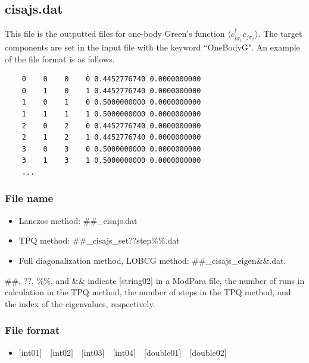 \newpage
\subsection{cisajs.dat}
\label{Subsec:cgcisajs}
This file is the outputted files for one-body Green's function $\langle c_{i\sigma_1}^{\dagger}c_{j\sigma_2}\rangle$. 
The target components are set in the input file with the keyword ``OneBodyG".
An example of the file format is as follows.

\begin{minipage}{12.5cm}
\begin{screen}
\begin{verbatim}
    0    0    0    0 0.4452776740 0.0000000000
    0    1    0    1 0.4452776740 0.0000000000
    1    0    1    0 0.5000000000 0.0000000000
    1    1    1    1 0.5000000000 0.0000000000
    2    0    2    0 0.4452776740 0.0000000000
    2    1    2    1 0.4452776740 0.0000000000
    3    0    3    0 0.5000000000 0.0000000000
    3    1    3    1 0.5000000000 0.0000000000
    ...
\end{verbatim}
\end{screen}
\end{minipage}

\subsubsection{File name}
 \begin{itemize}
   \item{Lanczos method:}  \#\#\_cisajs.dat
   \item{TPQ method:} \#\#\_cisajs\_set??step\%\%.dat
   \item{Full diagonalization method, LOBCG method:}  \#\#\_cisajs\_eigen{\&\&}.dat.
  \end{itemize}
  \#\#, ??, \%\%, and \&\& indicate [string02] in a ModPara file, the number of runs in calculation in the TPQ method, the number of steps in the TPQ method, and the index of the eigenvalues, respectively.


\subsubsection{File format}
 \begin{itemize}
   \item  $[$int01$]$~~$[$int02$]$~~$[$int03$]$~~$[$int04$]$~~$[$double01$]$~~$[$double02$]$
  \end{itemize}
